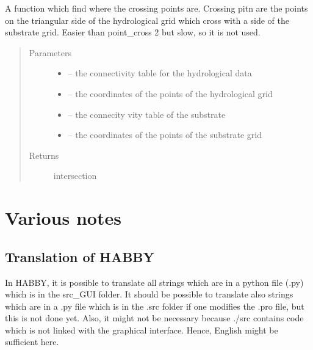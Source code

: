 \documentclass[letterpaper,10pt,english]{sphinxmanual}
\begin{document}
\begin{fulllineitems}
\label{\detokenize{index:src.substrate.point_cross_bis}}
A function which find where the crossing points are. Crossing pitn are the points on the triangular side of the
hydrological grid which cross with a side of the substrate grid. Easier than point\_cross 2 but slow, so it is not used.
\begin{quote}\begin{description}
\item[{Parameters}] \leavevmode\begin{itemize}
\item {} 
 -- the connectivity table for the hydrological data

\item {} 
 -- the coordinates of the points of the hydrological grid

\item {} 
 -- the connecity vity table of the substrate

\item {} 
 -- the coordinates of the points of the substrate grid

\end{itemize}

\item[{Returns}] \leavevmode
intersection

\end{description}\end{quote}

\end{fulllineitems}



\chapter{Various notes}
\label{\detokenize{index:various-notes}}

\section{Translation of HABBY}
\label{\detokenize{index:translation-of-habby}}
In HABBY, it is possible to translate all strings which are in a python file (.py)
which is in the src\_GUI folder. It should be possible to translate also strings which
are in a .py file which is in the .src folder if one modifies the .pro file,
but this is not done yet. Also, it might not be necessary because ./src contains
code which is not linked with the graphical interface. Hence, English might be sufficient here.
\end{document}
